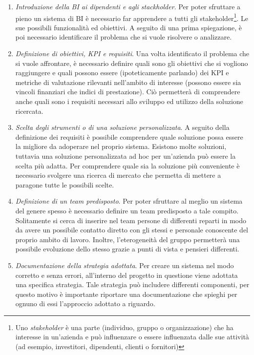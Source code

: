 \begin{enumerate}
    \item \textit{Introduzione della BI ai dipendenti e agli stackholder}. Per poter sfruttare a pieno un sistema di BI è necessario far apprendere a tutti gli stakeholder\footnote{Uno \textit{stakeholder} è una parte (individuo, gruppo o organizzazione) che ha interesse in un'azienda e può influenzare o essere influenzata dalle sue attività (ad esempio, investitori, dipendenti, clienti o fornitori)}. Le sue possibili funzionalità ed obiettivi. A seguito di una prima spiegazione, è poi necessario identificare il problema che si vuole risolvere o analizzare.
    \item \textit{Definizione di obiettivi, KPI e requisiti}. Una volta identificato il problema che si vuole affrontare, è necessario definire quali sono gli obiettivi che si vogliono raggiungere e quali possono essere (ipoteticamente parlando) dei KPI e metriche di valutazione rilevanti nell'ambito di interesse (possono essere sia vincoli finanziari che indici di prestazione). Ciò permetterà di comprendere anche quali sono i requisiti necessari allo sviluppo ed utilizzo della soluzione ricercata.
    \item \textit{Scelta degli strumenti o di una soluzione personalizzata}. A seguito della definizione dei requisiti è possibile comprendere quale soluzione possa essere la migliore da adoperare nel proprio sistema. Esistono molte soluzioni, tuttavia una soluzione personalizzata ad hoc per un'azienda può essere la scelta più adatta. Per comprendere quale sia la soluzione più conveniente è necessario svolgere una ricerca di mercato che permetta di mettere a paragone tutte le possibili scelte.
    \item \textit{Definizione di un team predisposto}. Per poter sfruttare al meglio un sistema del genere spesso è necessario definire un team predisposto a tale compito. Solitamente si cerca di inserire nel team persone di differenti reparti in modo da avere un possibile contatto diretto con gli stessi e personale conoscente del proprio ambito di lavoro. Inoltre, l'eterogeneità del gruppo permetterà una possibile evoluzione dello stesso grazie a punti di vista e pensieri differenti.
    \item \textit{Documentazione della strategia adottata}. Per creare un sistema nel modo corretto e senza errori, all'interno del progetto in questione viene adottata una specifica strategia. Tale strategia può includere differenti componenti, per questo motivo è importante riportare una documentazione che spieghi per ognuno di essi l'approccio adottato a riguardo.

\end{enumerate}
